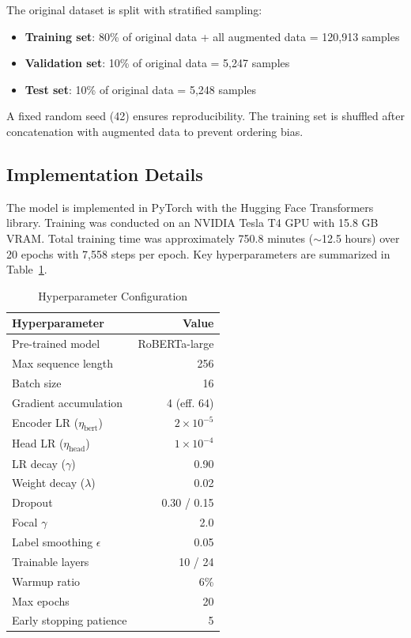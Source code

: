 \documentclass[conference, 10pt]{IEEEtran}
\begin{document}
The original dataset is split with stratified sampling:
\begin{itemize}[noitemsep]
    \item \textbf{Training set}: 80\% of original data + all augmented data = 120,913 samples
    \item \textbf{Validation set}: 10\% of original data = 5,247 samples
    \item \textbf{Test set}: 10\% of original data = 5,248 samples
\end{itemize}

A fixed random seed (42) ensures reproducibility. The training set is shuffled after concatenation with augmented data to prevent ordering bias.

\subsection{Implementation Details}

The model is implemented in PyTorch with the Hugging Face Transformers library. Training was conducted on an NVIDIA Tesla T4 GPU with 15.8 GB VRAM. Total training time was approximately 750.8 minutes ($\sim$12.5 hours) over 20 epochs with 7,558 steps per epoch. Key hyperparameters are summarized in Table~\ref{tab:hyperparams}.

\begin{table}[t]
    \centering
    \caption{Hyperparameter Configuration}
    \label{tab:hyperparams}
    \begin{tabular}{lr}
        \toprule
        \textbf{Hyperparameter} & \textbf{Value} \\
        \midrule
        Pre-trained model       & RoBERTa-large \\
        Max sequence length     & 256 \\
        Batch size              & 16 \\
        Gradient accumulation   & 4 (eff. 64) \\
        Encoder LR ($\eta_{\text{bert}}$) & $2 \times 10^{-5}$ \\
        Head LR ($\eta_{\text{head}}$)    & $1 \times 10^{-4}$ \\
        LR decay ($\gamma$)     & 0.90 \\
        Weight decay ($\lambda$)& 0.02 \\
        Dropout                 & 0.30 / 0.15 \\
        Focal $\gamma$          & 2.0 \\
        Label smoothing $\epsilon$ & 0.05 \\
        Trainable layers        & 10 / 24 \\
        Warmup ratio            & 6\% \\
        Max epochs              & 20 \\
        Early stopping patience & 5 \\
        \bottomrule
    \end{tabular}
\end{table}
\end{document}
